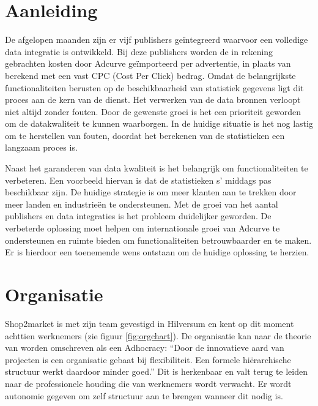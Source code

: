 \clearpage

\section{Aanleiding} %
\label{sec:aanleiding}

De afgelopen maanden zijn er vijf publishers geïntegreerd waarvoor een volledige data integratie is ontwikkeld. Bij deze publishers worden de in rekening gebrachten kosten door Adcurve geïmporteerd per advertentie, in plaats van berekend met een vast CPC (Cost Per Click) bedrag.
Omdat de belangrijkste functionaliteiten berusten op de beschikbaarheid van statistiek gegevens ligt dit proces aan de kern van de dienst. Het verwerken van de data bronnen verloopt niet altijd zonder fouten. Door de gewenste groei is het een prioriteit geworden om de datakwaliteit te kunnen waarborgen. In de huidige situatie is het nog lastig om te herstellen van fouten, doordat het berekenen van de statistieken een langzaam proces is.

Naast het garanderen van data kwaliteit is het belangrijk om functionaliteiten te verbeteren. Een voorbeeld hiervan is dat de statistieken s' middags pas beschikbaar zijn. De huidige strategie is om meer klanten aan te trekken door meer landen en industrieën te ondersteunen. Met de groei van het aantal publishers en data integraties is het probleem duidelijker geworden. De verbeterde oplossing moet helpen om internationale groei van Adcurve te ondersteunen en ruimte bieden om functionaliteiten betrouwbaarder en te maken. Er is hierdoor een toenemende wens ontstaan om de huidige oplossing te herzien.

\section{Organisatie} %
\label{sec:organisatie}

Shop2market is met zijn team gevestigd in Hilversum en kent op dit moment achttien werknemers (zie figuur \ref{fig:orgchart}). De organisatie kan naar de theorie van
\autocite{mintzberg} worden omschreven als een Adhocracy: “Door de innovatieve aard van projecten is een organisatie gebaat bij flexibiliteit. Een formele hiërarchische structuur werkt daardoor minder goed.” Dit is herkenbaar en valt terug te leiden naar de professionele houding die van werknemers wordt verwacht. Er wordt autonomie gegeven om zelf structuur aan te brengen wanneer dit nodig is.

